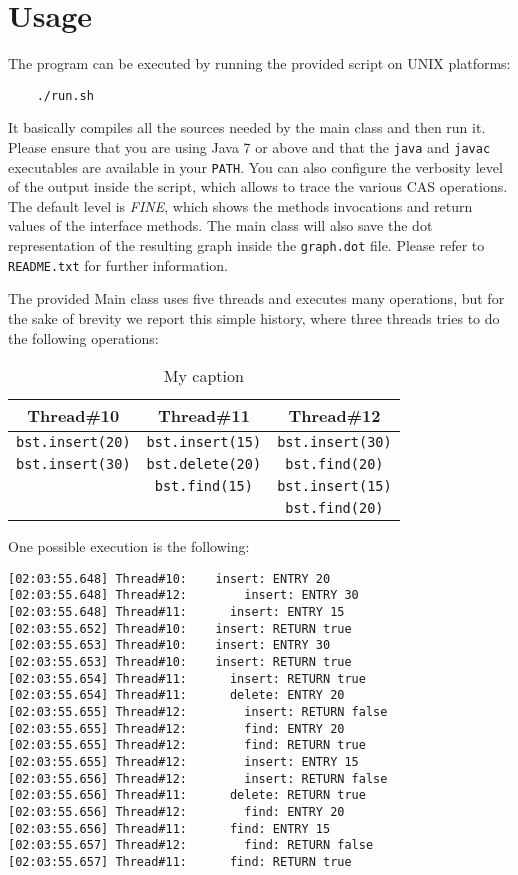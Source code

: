 \documentclass[a4paper,draft,12pt]{article}
\begin{document}
\section{Usage} %
\label{sec:usage}
The program can be executed by running the provided script on UNIX platforms:
\begin{verbatim}
    ./run.sh
\end{verbatim}
It basically compiles all the sources needed by the main class and then run it.
Please ensure that you are using Java 7 or above and that the \texttt{java} and \texttt{javac} executables are available in your \texttt{PATH}.
You can also configure the verbosity level of the output inside the script, which allows to trace the various \ac{CAS} operations.
The default level is \emph{FINE}, which shows the methods invocations and return values of the interface methods.
The main class will also save the dot representation of the resulting graph inside the \texttt{graph.dot} file.
Please refer to \texttt{README.txt} for further information.

The provided Main class uses five threads and executes many operations, but for the sake of brevity we report this simple history, where three threads tries to do the following operations:

\begin{table}[H]
\centering

\label{my-label}
\begin{tabular}{c|c|c}
{\bf Thread\#10} & {\bf Thread\#11} & {\bf Thread\#12} \\
\hline
\texttt{bst.insert(20)}   & \texttt{bst.insert(15)}   & \texttt{bst.insert(30)}   \\
\texttt{bst.insert(30)}   & \texttt{bst.delete(20)}   & \texttt{bst.find(20)}     \\
                 & \texttt{bst.find(15)}     & \texttt{bst.insert(15)}   \\
                 &                  & \texttt{bst.find(20)}
\end{tabular}
\caption{My caption}
\end{table}

One possible execution is the following:
\begin{verbatim}
[02:03:55.648] Thread#10:    insert: ENTRY 20
[02:03:55.648] Thread#12:        insert: ENTRY 30
[02:03:55.648] Thread#11:      insert: ENTRY 15
[02:03:55.652] Thread#10:    insert: RETURN true
[02:03:55.653] Thread#10:    insert: ENTRY 30
[02:03:55.653] Thread#10:    insert: RETURN true
[02:03:55.654] Thread#11:      insert: RETURN true
[02:03:55.654] Thread#11:      delete: ENTRY 20
[02:03:55.655] Thread#12:        insert: RETURN false
[02:03:55.655] Thread#12:        find: ENTRY 20
[02:03:55.655] Thread#12:        find: RETURN true
[02:03:55.655] Thread#12:        insert: ENTRY 15
[02:03:55.656] Thread#12:        insert: RETURN false
[02:03:55.656] Thread#11:      delete: RETURN true
[02:03:55.656] Thread#12:        find: ENTRY 20
[02:03:55.656] Thread#11:      find: ENTRY 15
[02:03:55.657] Thread#12:        find: RETURN false
[02:03:55.657] Thread#11:      find: RETURN true
\end{verbatim}
\end{document}
